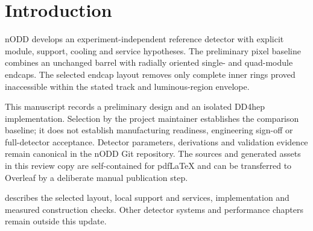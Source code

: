 \chapter{Introduction}
\label{ch:introduction}
nODD develops an experiment-independent reference detector with explicit module,
support, cooling and service hypotheses. The preliminary pixel baseline combines
an unchanged barrel with radially oriented single- and quad-module endcaps.
The selected endcap layout removes only complete inner rings proved inaccessible
within the stated track and luminous-region envelope.

This manuscript records a preliminary design and an isolated DD4hep implementation.
Selection by the project maintainer establishes the comparison baseline; it does
not establish manufacturing readiness, engineering sign-off or full-detector
acceptance. Detector parameters, derivations and validation evidence remain
canonical in the nODD Git repository. The sources and generated assets in this
review copy are self-contained for pdfLaTeX and can be transferred to Overleaf
by a deliberate manual publication step.

 describes the selected layout, local support and services,
implementation and measured construction checks. Other detector systems and
performance chapters remain outside this update.
